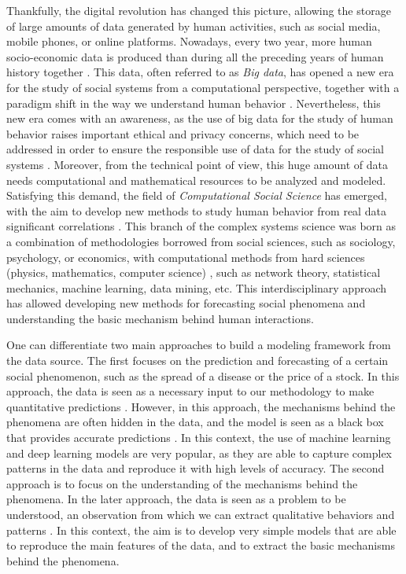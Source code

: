 Thankfully, the digital revolution has changed this picture, allowing the storage of large amounts of data generated by human activities, such as social media, mobile phones, or online platforms. Nowadays, every two year, more human socio-economic data is produced than during all the preceding years of human history together \cite{karsai2019computational}. This data, often referred to as \textit{Big data}, has opened a new era for the study of social systems from a computational perspective, together with a paradigm shift in the way we understand human behavior \cite{manyika-2011}. Nevertheless, this new era comes with an awareness, as the use of big data for the study of human behavior raises important ethical and privacy concerns, which need to be addressed in order to ensure the responsible use of data for the study of social systems \cite{boyd-2012}. Moreover, from the technical point of view, this huge amount of data needs computational and mathematical resources to be analyzed and modeled. Satisfying this demand, the field of \textit{Computational Social Science} has emerged, with the aim to develop new methods to study human behavior from real data significant correlations \cite{Lazer2009CompSocSci}. This branch of the complex systems science was born as a combination of methodologies borrowed from social sciences, such as sociology, psychology, or economics, with computational methods from hard sciences (physics, mathematics, computer science) \cite{watts-2007}, such as network theory, statistical mechanics, machine learning, data mining, etc. This interdisciplinary approach has allowed developing new methods for forecasting social phenomena and understanding the basic mechanism behind human interactions. 

One can differentiate two main approaches to build a modeling framework from the data source. The first focuses on the prediction and forecasting of a certain social phenomenon, such as the spread of a disease or the price of a stock. In this approach, the data is seen as a necessary input to our methodology to make quantitative predictions \cite{Lazer2009CompSocSci}. However, in this approach, the mechanisms behind the phenomena are often hidden in the data, and the model is seen as a black box that provides accurate predictions \cite{rudin-2019}. In this context, the use of machine learning \cite{murphy-2012} and deep learning \cite{goodfellow-2016} models are  very popular, as they are able to capture complex patterns in the data and reproduce it with high levels of accuracy. The second approach is to focus on the understanding of the mechanisms behind the phenomena. In the later approach, the data is seen as a problem to be understood, an observation from which we can extract qualitative behaviors and patterns \cite{axelrod2006agent}. In this context, the aim is to develop very simple models that are able to reproduce the main features of the data, and to extract the basic mechanisms behind the phenomena.


